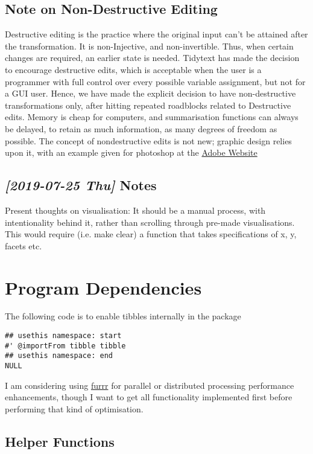 \documentclass[a4paper, 11pt]{article}
\begin{document}
\subsection{Note on Non-Destructive Editing}
\label{sec:org08d2615}
Destructive editing is the practice where the original input can't be
attained after the transformation. It is non-Injective, and
non-invertible. Thus, when certain changes are required, an earlier
state is needed. Tidytext has made the decision to encourage
destructive edits, which is acceptable when the user is a programmer
with full control over every possible variable assignment, but not for
a GUI user. Hence, we have made the explicit decision to have
non-destructive transformations only, after hitting repeated
roadblocks related to Destructive edits. Memory is cheap for
computers, and summarisation functions can always be delayed, to
retain as much information, as many degrees of freedom as possible.
The concept of nondestructive edits is not new; graphic design relies
upon it, with an example given for photoshop at the \href{https://helpx.adobe.com/photoshop/using/nondestructive-editing.html}{Adobe Website}
\subsection{\textit{[2019-07-25 Thu] } Notes}
\label{sec:orgc0cc0a7}
Present thoughts on visualisation: It should be a manual process, with
intentionality behind it, rather than scrolling through pre-made
visualisations. This would require (i.e. make clear) a function that
takes specifications of x, y, facets etc.
\section{Program Dependencies}
\label{sec:org753b91d}
The following code is to enable tibbles internally in the package
\begin{verbatim}
## usethis namespace: start
#' @importFrom tibble tibble
## usethis namespace: end
NULL
\end{verbatim}

I am considering using \href{https://davisvaughan.github.io/furrr/}{furrr} for parallel or distributed processing
performance enhancements, though I want to get all functionality
implemented first before performing that kind of optimisation.
\subsection{Helper Functions}
\label{sec:org3025384}
\end{document}
